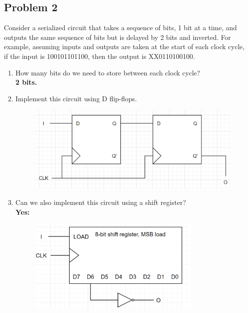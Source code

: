 \documentclass{article}
\begin{document}
\subsection*{Problem 2}
Consider a serialized circuit that takes a sequence of bits, 1 bit at a time, and outputs the same sequence of bits but is delayed by 2 bits and inverted. For example, assuming inputs and outputs are taken at the start of each clock cycle, if the input is 100101101100, then the output is XX0110100100.
\begin{enumerate}[label=\alph*.]
    \item How many bits do we need to store between each clock cycle? \\
    \textbf{2 bits.}
    \item Implement this circuit using D flip-flops.
    \begin{figure}[!h]
        \centering
        \includegraphics[width=1\textwidth]{figures/serial2b_solution.png}
    \end{figure}
    \item Can we also implement this circuit using a shift register? \\
    \textbf{Yes:}
    \begin{figure}[!h]
        \centering
        \includegraphics[width=0.8\textwidth]{figures/serial2c_solution.png}
    \end{figure}
\end{enumerate}
\end{document}
